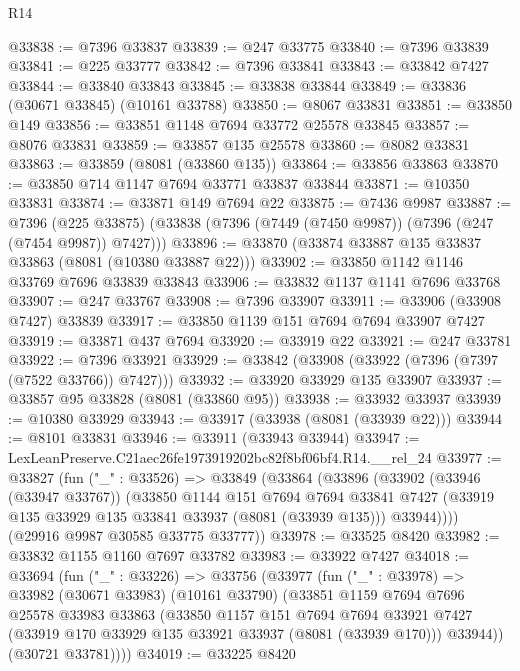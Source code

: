 \begin{lexlean}{R14}
\begin{coremodule}
@33838 := @7396 @33837
@33839 := @247 @33775
@33840 := @7396 @33839
@33841 := @225 @33777
@33842 := @7396 @33841
@33843 := @33842 @7427
@33844 := @33840 @33843
@33845 := @33838 @33844
@33849 := @33836 (@30671 @33845) (@10161 @33788)
@33850 := @8067 @33831
@33851 := @33850 @149
@33856 := @33851 @1148 @7694 @33772 @25578 @33845
@33857 := @8076 @33831
@33859 := @33857 @135 @25578
@33860 := @8082 @33831
@33863 := @33859 (@8081 (@33860 @135))
@33864 := @33856 @33863
@33870 := @33850 @714 @1147 @7694 @33771 @33837 @33844
@33871 := @10350 @33831
@33874 := @33871 @149 @7694 @22
@33875 := @7436 @9987
@33887 := @7396
    (@225 @33875)
    (@33838 (@7396 (@7449 (@7450 @9987)) (@7396 (@247 (@7454 @9987)) @7427)))
@33896 := @33870 (@33874 @33887 @135 @33837 @33863 (@8081 (@10380 @33887 @22)))
@33902 := @33850 @1142 @1146 @33769 @7696 @33839 @33843
@33906 := @33832 @1137 @1141 @7696 @33768
@33907 := @247 @33767
@33908 := @7396 @33907
@33911 := @33906 (@33908 @7427) @33839
@33917 := @33850 @1139 @151 @7694 @7694 @33907 @7427
@33919 := @33871 @437 @7694
@33920 := @33919 @22
@33921 := @247 @33781
@33922 := @7396 @33921
@33929 := @33842 (@33908 (@33922 (@7396 (@7397 (@7522 @33766)) @7427)))
@33932 := @33920 @33929 @135 @33907
@33937 := @33857 @95 @33828 (@8081 (@33860 @95))
@33938 := @33932 @33937
@33939 := @10380 @33929
@33943 := @33917 (@33938 (@8081 (@33939 @22)))
@33944 := @8101 @33831
@33946 := @33911 (@33943 @33944)
@33947 := LexLeanPreserve.C21aec26fe1973919202bc82f8bf06bf4.R14.__rel_24
@33977 := @33827
    (fun ("_" : @33526) =>
    @33849
      (@33864
        (@33896
          (@33902
            (@33946 (@33947 @33767))
            (@33850
              @1144
              @151
              @7694
              @7694
              @33841
              @7427
              (@33919 @135 @33929 @135 @33841 @33937 (@8081 (@33939 @135)))
              @33944))))
      (@29916 @9987 @30585 @33775 @33777))
@33978 := @33525 @8420
@33982 := @33832 @1155 @1160 @7697 @33782
@33983 := @33922 @7427
@34018 := @33694
    (fun ("_" : @33226) =>
    @33756
      (@33977
        (fun ("_" : @33978) =>
        @33982
          (@30671 @33983)
          (@10161 @33790)
          (@33851
            @1159
            @7694
            @7696
            @25578
            @33983
            @33863
            (@33850
              @1157
              @151
              @7694
              @7694
              @33921
              @7427
              (@33919 @170 @33929 @135 @33921 @33937 (@8081 (@33939 @170)))
              @33944))
          (@30721 @33781))))
@34019 := @33225 @8420

\end{coremodule}
\end{lexlean}
